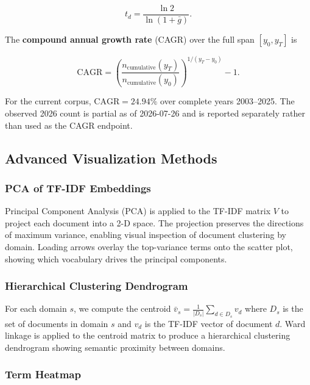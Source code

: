 \documentclass[
  english,
]{article}
\newcommand{\cagr}{\text{CAGR}}
\begin{document}
\begin{equation}
t_d = \frac{\ln 2}{\ln(1 + \bar{g})}. \label{eq:doubling_time}
\end{equation}

The \textbf{compound annual growth rate} (CAGR) over the full span
\([y_0, y_T]\) is

\begin{equation}
\cagr = \left(\frac{n_{\text{cumulative}}(y_T)}{n_{\text{cumulative}}(y_0)}\right)^{1/(y_T - y_0)} - 1. \label{eq:cagr}
\end{equation}

For the current corpus, \(\cagr = 24.94\%\) over complete years
2003--2025. The observed 2026 count is partial as of 2026-07-26 and is
reported separately rather than used as the CAGR endpoint.

\FloatBarrier

\subsection{Advanced Visualization Methods}\label{sec:appendix_viz}

\subsubsection{PCA of TF-IDF Embeddings}\label{pca-of-tf-idf-embeddings}

Principal Component Analysis (PCA) is applied to the TF-IDF matrix \(V\)
to project each document into a 2-D space. The projection preserves the
directions of maximum variance, enabling visual inspection of document
clustering by domain. Loading arrows overlay the top-variance terms onto
the scatter plot, showing which vocabulary drives the principal
components.

\subsubsection{Hierarchical Clustering
Dendrogram}\label{hierarchical-clustering-dendrogram}

For each domain \(s\), we compute the centroid
\(\bar{v}_s = \frac{1}{|D_s|} \sum_{d \in D_s} v_d\) where \(D_s\) is
the set of documents in domain \(s\) and \(v_d\) is the TF-IDF vector of
document \(d\). Ward linkage is applied to the centroid matrix to
produce a hierarchical clustering dendrogram showing semantic proximity
between domains.

\subsubsection{Term Heatmap}\label{term-heatmap}
\end{document}
